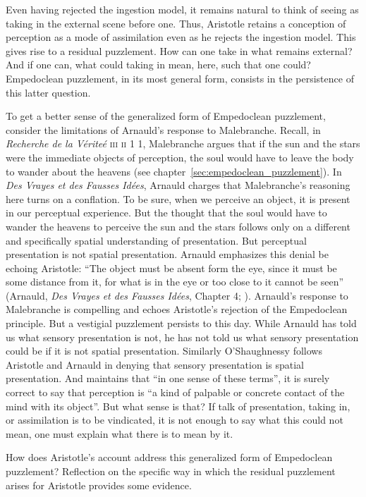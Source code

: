 Even having rejected the ingestion model, it remains natural to think of seeing as taking in the external scene before one. Thus, Aristotle retains a conception of perception as a mode of assimilation even as he rejects the ingestion model. This gives rise to a residual puzzlement. How can one take in what remains external? And if one can, what could taking in mean, here, such that one could? Empedoclean puzzlement, in its most general form, consists in the persistence of this latter question. 

To get a better sense of the generalized form of Empedoclean puzzlement, consider the limitations of Arnauld's response to Malebranche. Recall, in \emph{Recherche de la V\'{e}rite\'{e}} \textsc{iii} \textsc{ii} 1 1, Malebranche argues that if the sun and the stars were the immediate objects of perception, the soul would have to leave the body to wander about the heavens (see chapter~\ref{sec:empedoclean_puzzlement}). In \emph{Des Vrayes et des Fausses Id\'{e}es}, Arnauld charges that Malebranche's reasoning here turns on a conflation. To be sure, when we perceive an object, it is present in our perceptual experience. But the thought that the soul would have to wander the heavens to perceive the sun and the stars follows only on a different and specifically spatial understanding of presentation. But perceptual presentation is not spatial presentation. Arnauld emphasizes this denial be echoing Aristotle: ``The object must be absent form the eye, since it must be some distance from it, for what is in the eye or too close to it cannot be seen'' (Arnauld, \emph{Des Vrayes et des Fausses Id\'{e}es}, Chapter 4; \citealt[62]{Gaukroger:1990rz}). Arnauld's response to Malebranche is compelling and echoes Aristotle's rejection of the Empedoclean principle. But a vestigial puzzlement persists to this day. While Arnauld has told us what sensory presentation is not, he has not told us what sensory presentation could be if it is not spatial presentation. Similarly O'Shaughnessy follows Aristotle and Arnauld in denying that sensory presentation is spatial presentation. And \cite[183]{OShaughnessy:2003eu} maintains that ``in one sense of these terms'', it is surely correct to say that perception is ``a kind of palpable or concrete contact of the mind with its object''. But what sense is that? If talk of presentation, taking in, or assimilation is to be vindicated, it is not enough to say what this could not mean, one must explain what there is to mean by it.

How does Aristotle's account address this generalized form of Empedoclean puzzlement? Reflection on the specific way in which the residual puzzlement arises for Aristotle provides some evidence.

